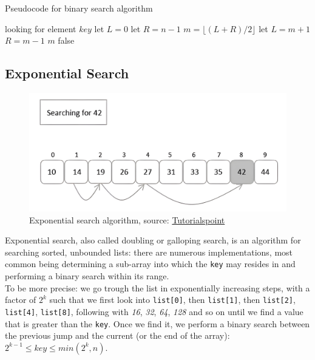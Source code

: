 \begin{algorithm}
    \captionsetup{labelsep=newline}
    \caption{Pseudocode for binary search algorithm \label{alg:binsearch}}
    \begin{algorithmic}[1]
        \State looking for element $key$
        \State let $L=0$ 
        \State let $R=n-1$ 
            \State $m=\lfloor (L+R)/2 \rfloor$
                \State let $L=m+1$
                \State $R = m - 1$
            \Else
                \State \Return $m$ 
            \EndIf
        \EndWhile
        \State \Return false 
    \end{algorithmic}
\end{algorithm}

\subsection{Exponential Search}

\begin{figure}[H] 
    \begin{center}
        \includegraphics[width=.8\textwidth]{imgs/exponential_search.png}
        \caption{Exponential search algorithm, source: \href{https://www.tutorialspoint.com/data_structures_algorithms/exponential_search.htm}{Tutorialspoint}\label{fig:expsearch}}
    \end{center}
\end{figure}

Exponential search, also called doubling or galloping search, is an algorithm for searching sorted, unbounded lists: there are numerous implementations, most common being determining a sub-array into which the \verb|key| may resides in and performing a binary search  within its range.\\
To be more precise: we go trough the list in exponentially increasing steps, with a factor of $2^k$ such that we first look into \verb+list[0]+, then \verb+list[1]+, then \verb+list[2]+, \verb+list[4]+, \verb+list[8]+, following with \textit{16}, \textit{32}, \textit{64}, \textit{128} and so on until we find a value that is greater than the \verb|key|. Once we find it, we perform a binary search between the previous jump and the current (or the end of the array): $2^{k-1} \leq key \leq min(2^{k},n)$.

